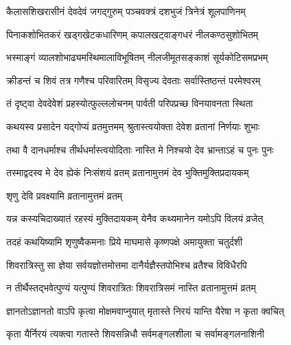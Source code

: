 

\twolineshloka
{कैलासशिखरासीनं देवदेवं जगद्गुरुम्}
{पञ्चवक्त्रं दशभुजं त्रिनेत्रं शूलपाणिनम्}%

\twolineshloka
{पिनाकशोभितकरं खड्गखेटकधारिणम्}
{कपालखट्वाङ्गधरं नीलकण्ठसुशोभितम्}%

\twolineshloka
{भस्माङ्गं व्यालशोभाढ्यमस्थिमालाविभूषितम्}
{नीलजीमूतसङ्काशं सूर्यकोटिसमप्रभम्}%

\twolineshloka
{क्रीडन्तं च शिवं तत्र गणैश्च परिवारितम्}
{विसृज्य देवताः सर्वास्तिष्ठन्तं परमेश्वरम्}%

\twolineshloka
{तं दृष्ट्वा देवदेवेशं प्रहस्योत्फुल्ललोचनम्}
{पार्वती परिपप्रच्छ विनयावनता स्थिता}%


\twolineshloka
{कथयस्व प्रसादेन यद्गोप्यं व्रतमुत्तमम्}
{श्रुतास्त्वयोक्ता देवेश व्रतानां निर्णयाः शुभाः}%

\twolineshloka
{तथा वै दानधर्माश्च तीर्थधर्मास्त्वयोदिताः}
{नास्ति मे निश्चयो देव भ्रान्ताऽहं च पुनः पुनः}%

\twolineshloka
{तस्माद्वदस्व मे देव ह्येकं निःसंशयं व्रतम्}
{व्रतानामुत्तमं देव भुक्तिमुक्तिप्रदायकम्}%



\onelineshloka
{शृणु देवि प्रवक्ष्यामि\footnotemark{} व्रतानामुत्तमं व्रतम्}%

\twolineshloka
{यन्न कस्यचिदाख्यातं रहस्यं मुक्तिदायकम्}
{येनैव कथ्यमानेन यमोऽपि विलयं व्रजेत्}%

\twolineshloka
{तदहं कथयिष्यामि शृणुष्वैकमनाः प्रिये}
{माघमासे कृष्णपक्षे अमायुक्ता चतुर्दशी\footnotemark{}}%

\twolineshloka
{शिवरात्रिस्तु सा ज्ञेया सर्वयज्ञोत्तमोत्तमा}
{दानैर्यज्ञैस्तपोभिश्च व्रतैश्च विविधैरपि}%

\twolineshloka
{न तीर्थैस्तद्भवेत्पुण्यं यत्पुण्यं शिवरात्रितः}
{शिवरात्रिसमं नास्ति व्रतानामुत्तमं व्रतम्}%

\twolineshloka
{ज्ञानतोऽज्ञानतो वाऽपि कृत्वा मोक्षमवाप्नुयात्}
{मृतास्ते निरयं यान्ति यैरेषा न कृता क्वचित्}%

\twolineshloka
{कृता यैर्निरयं त्यक्त्वा गतास्ते शिवसन्निधौ}
{सर्वमङ्गलशीला च सर्वामङ्गलनाशिनी}%



